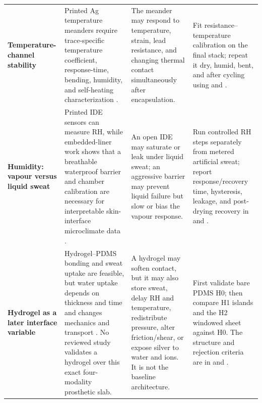 \begin{tabularx}{\linewidth}{>{\raggedright\arraybackslash\bfseries\color{AUBRed}}p{2.38cm}Y Y Y}
Temperature-channel stability &
Printed Ag temperature meanders require trace-specific temperature
coefficient, response-time, bending, humidity, and self-heating
characterization \cite{liew2020,jager2022}. &
The meander may respond to temperature, strain, lead resistance, and changing
thermal contact simultaneously after encapsulation. &
Fit resistance--temperature calibration on the final stack; repeat it dry,
humid, bent, and after cycling using
 and
. \\
Humidity: vapour versus liquid sweat &
Printed IDE sensors can measure RH, while embedded-liner work shows that a
breathable waterproof barrier and chamber calibration are necessary for
interpretable skin-interface microclimate data
\cite{aitmammar2020,paterno2020}. &
An open IDE may saturate or leak under liquid sweat; an aggressive barrier may
prevent liquid failure but slow or bias the vapour response. &
Run controlled RH steps separately from metered artificial sweat; report
response/recovery time, hysteresis, leakage, and post-drying recovery in
 and
. \\
Hydrogel as a later interface variable &
Hydrogel--PDMS bonding and sweat uptake are feasible, but water uptake depends
on thickness and time and changes mechanics and transport
\cite{yuk2016,lu2025}. No reviewed study validates a hydrogel over this exact
four-modality prosthetic slab. &
A hydrogel may soften contact, but it may also store sweat, delay RH and
temperature, redistribute pressure, alter friction/shear, or expose silver to
water and ions. It is not the baseline architecture. &
First validate bare PDMS H0; then compare H1 islands and the H2 windowed sheet
against H0. The structure and rejection criteria are in
 and
. \\
\end{tabularx}
\endgroup

